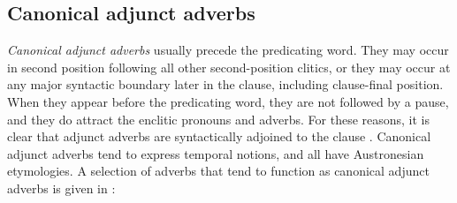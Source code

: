 \subsection{Canonical adjunct adverbs}
\label{bkm:Ref52688127} \label{sec:adjunctadverbs} 

\textit{Canonical adjunct adverbs} usually precede the predicating word. They may occur in second position following all other second-position clitics, or they may occur at any major syntactic boundary later in the clause, including clause-final position. When they appear before the predicating word, they are not followed by a pause, and they do attract the enclitic pronouns and adverbs. For these reasons, it is clear that adjunct adverbs are syntactically adjoined to the clause \citep{greenbaum1996}. Canonical adjunct adverbs tend to express temporal notions, and all have Austronesian etymologies. A selection of adverbs that tend to function as canonical adjunct adverbs is given in :

